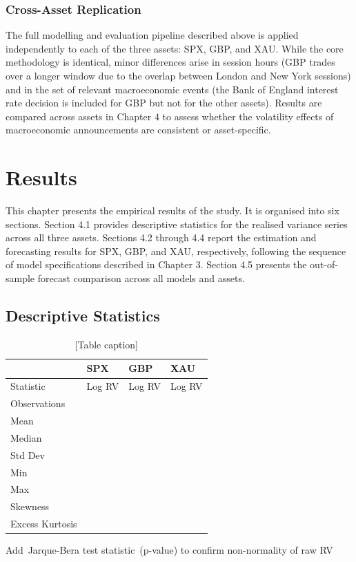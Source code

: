 \documentclass[12pt,a4paper]{report}
\begin{document}
\subsection{Cross-Asset Replication}
The full modelling and evaluation pipeline described above is applied independently to each of the three assets: SPX, GBP, and XAU. While the core methodology is identical, minor differences arise in session hours (GBP trades over a longer window due to the overlap between London and New York sessions) and in the set of relevant macroeconomic events (the Bank of England interest rate decision is included for GBP but not for the other assets). Results are compared across assets in Chapter 4 to assess whether the volatility effects of macroeconomic announcements are consistent or asset-specific.

\chapter{Results}
This chapter presents the empirical results of the study. It is organised into six sections. Section 4.1 provides descriptive statistics for the realised variance series across all three assets. Sections 4.2 through 4.4 report the estimation and forecasting results for SPX, GBP, and XAU, respectively, following the sequence of model specifications described in Chapter 3. Section 4.5 presents the out-of-sample forecast comparison across all models and assets.

\section{Descriptive Statistics}
\begin{table}[H]
\centering
\begin{tabular}{|l|l|l|l|}
\hline
 & SPX & GBP & XAU \\
\hline
Statistic & Log RV & Log RV & Log RV \\
\hline
Observations &  &  &  \\
\hline
Mean &  &  &  \\
\hline
Median &  &  &  \\
\hline
Std Dev &  &  &  \\
\hline
Min &  &  &  \\
\hline
Max &  &  &  \\
\hline
Skewness &  &  &  \\
\hline
Excess Kurtosis &  &  &  \\
\hline
\end{tabular}
\caption{[Table caption]}
\end{table}
Add Jarque-Bera test statistic (p-value) to confirm non-normality of raw RV
\end{document}
